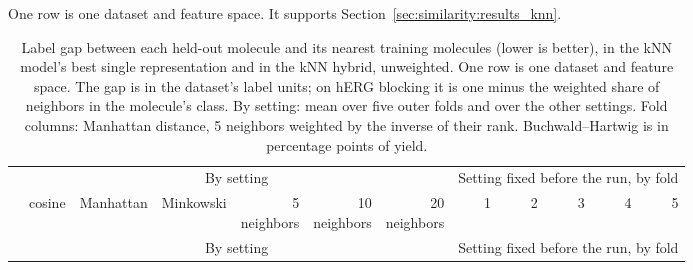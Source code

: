 \begin{landscape}
\label{app:add:similarity_retrieval_by_setting}
One row is one dataset and feature space. It supports Section~\ref{sec:similarity:results_knn}.

\enlargethispage{2\baselineskip}
\begin{longtable}{@{}lrrrrrrrrrrr@{}}
\caption[Label gap to the nearest neighbors by setting and by fold]{Label gap between each held-out molecule and its nearest training molecules (lower is better), in the kNN model's best single representation and in the kNN hybrid, unweighted. One row is one dataset and feature space. The gap is in the dataset's label units; on hERG blocking it is one minus the weighted share of neighbors in the molecule's class. By setting: mean over five outer folds and over the other settings. Fold columns: Manhattan distance, 5 neighbors weighted by the inverse of their rank. Buchwald--Hartwig is in percentage points of yield.}
\label{tab:similarity:retrieval_by_setting} \\
\toprule
 & \multicolumn{6}{c}{By setting} & \multicolumn{5}{c}{Setting fixed before the run, by fold} \\
\cmidrule(lr){2-7}\cmidrule(l){8-12}
 & cosine & Manhattan & Minkowski & \makecell[r]{5\\neighbors} & \makecell[r]{10\\neighbors} & \makecell[r]{20\\neighbors} & 1 & 2 & 3 & 4 & 5 \\
\midrule
\endfirsthead
\toprule
 & \multicolumn{6}{c}{By setting} & \multicolumn{5}{c}{Setting fixed before the run, by fold} \\

\end{longtable}
\end{landscape}
